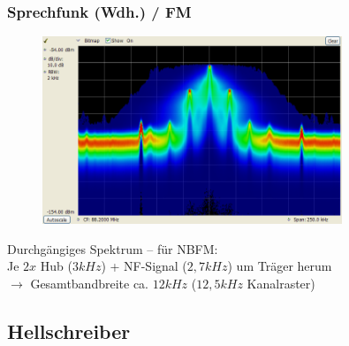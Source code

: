 \begin{frame}
  \frametitle{Sprechfunk (Wdh.) / FM}

  \begin{center}
    \begin{figure}
      \includegraphics[width=0.8\textwidth,height=.5\textheight,keepaspectratio]{e16/Dpx-fm-radio.png}
    \end{figure}
  \end{center}

  \centering Durchgängiges Spektrum -- für NBFM: \\
  Je $2x$ Hub ($3 kHz$) + NF-Signal ($2,7 kHz$) um Träger herum \\[1em]

  $\rightarrow$ Gesamtbandbreite ca. $12 kHz$ ($12,5 kHz$ Kanalraster)

\end{frame}

\subsection[Hell]{Hellschreiber}

